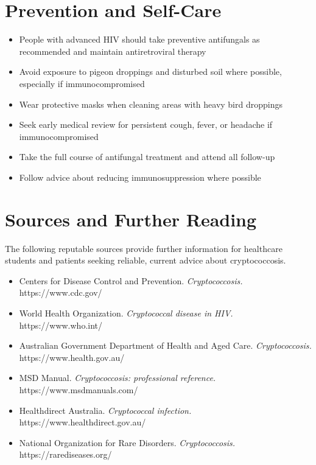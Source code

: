 \section*{Prevention and Self-Care}
\begin{itemize}
    \item People with advanced HIV should take preventive antifungals as recommended and maintain antiretroviral therapy
    \item Avoid exposure to pigeon droppings and disturbed soil where possible, especially if immunocompromised
    \item Wear protective masks when cleaning areas with heavy bird droppings
    \item Seek early medical review for persistent cough, fever, or headache if immunocompromised
    \item Take the full course of antifungal treatment and attend all follow-up
    \item Follow advice about reducing immunosuppression where possible
\end{itemize}

\section*{Sources and Further Reading}
The following reputable sources provide further information for healthcare students and patients seeking reliable, current advice about cryptococcosis.

\begin{itemize}
    \item Centers for Disease Control and Prevention. \textit{Cryptococcosis.} https://www.cdc.gov/
    \item World Health Organization. \textit{Cryptococcal disease in HIV.} https://www.who.int/
    \item Australian Government Department of Health and Aged Care. \textit{Cryptococcosis.} https://www.health.gov.au/
    \item MSD Manual. \textit{Cryptococcosis: professional reference.} https://www.msdmanuals.com/
    \item Healthdirect Australia. \textit{Cryptococcal infection.} https://www.healthdirect.gov.au/
    \item National Organization for Rare Disorders. \textit{Cryptococcosis.} https://rarediseases.org/
\end{itemize}
